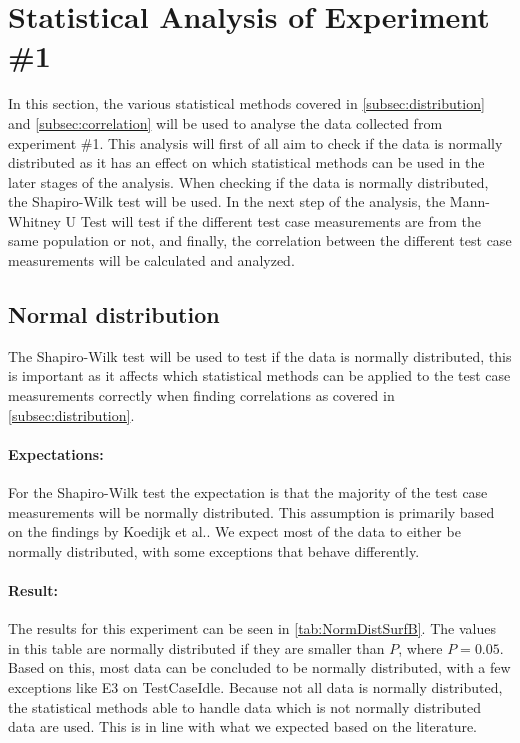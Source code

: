 \section{Statistical Analysis of Experiment \#1}\label{sec:Stat1}

In this section, the various statistical methods covered in \cref{subsec:distribution} and \cref{subsec:correlation} will be used to analyse the data collected from experiment \#1. This analysis will first of all aim to check if the data is normally distributed as it has an effect on which statistical methods can be used in the later stages of the analysis. When checking if the data is normally distributed, the Shapiro-Wilk test will be used. In the next step of the analysis, the Mann-Whitney U Test will test if the different test case measurements are from the same population or not, and finally, the correlation between the different test case measurements will be calculated and analyzed.

\subsection{Normal distribution}\label{subsec:NormalDist1}
The Shapiro-Wilk test will be used to test if the data is normally distributed, this is important as it affects which statistical methods can be applied to the test case measurements correctly when finding correlations as covered in \cref{subsec:distribution}. 

\paragraph{Expectations:} For the Shapiro-Wilk test the expectation is that the majority of the test case measurements will be normally distributed. This assumption is primarily based on the findings by Koedijk et al.\cite{Koedijk2022diff}. We expect most of the data to either be normally distributed, with some exceptions that behave differently.

\paragraph{Result:} The results for this experiment can be seen in \cref{tab:NormDistSurfB}. The values in this table are normally distributed if they are smaller than $P$, where $P = 0.05$. Based on this, most data can be concluded to be normally distributed, with a few exceptions like E3 on TestCaseIdle. Because not all data is normally distributed, the statistical methods able to handle data which is not normally distributed data are used. This is in line with what we expected based on the literature.

